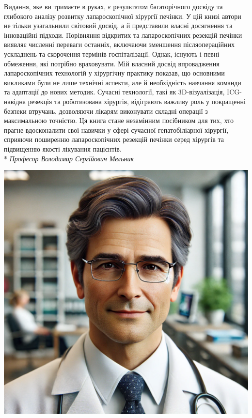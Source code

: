 \newpage

\noindent
\begin{minipage}{0.65\textwidth}
Видання, яке ви тримаєте в руках, є результатом багаторічного досвіду та глибокого аналізу розвитку лапароскопічної хірургії печінки. У цій книзі автори не тільки узагальнили світовий досвід, а й представили власні досягнення та інноваційні підходи. Порівняння відкритих та лапароскопічних резекцій печінки виявляє численні переваги останніх, включаючи зменшення післяопераційних ускладнень та скорочення термінів госпіталізації. Однак, існують і певні обмеження, які потрібно враховувати. Мій власний досвід впровадження лапароскопічних технологій у хірургічну практику показав, що основними викликами були не лише технічні аспекти, але й необхідність навчання команди та адаптації до нових методик. Сучасні технології, такі як 3D-візуалізація, ICG-навідна резекція та роботизована хірургія, відіграють важливу роль у покращенні безпеки втручань, дозволяючи лікарям виконувати складні операції з максимальною точністю. Ця книга стане незамінним посібником для тих, хто прагне вдосконалити свої навички у сфері сучасної гепатобіліарної хірургії, сприяючи поширенню лапароскопічних резекцій печінки серед хірургів та підвищенню якості лікування пацієнтів.  
\\*
\vspace{30pt} 
\vfill 
\hfill \textit{Професор Володимир Сергійович Мельник}
\vfill 
\end{minipage}
\hfill
\begin{minipage}{0.3\textwidth}
    \centering
    \includegraphics[width=\textwidth]{Illustrations/Preface/image2.png}
\end{minipage}
